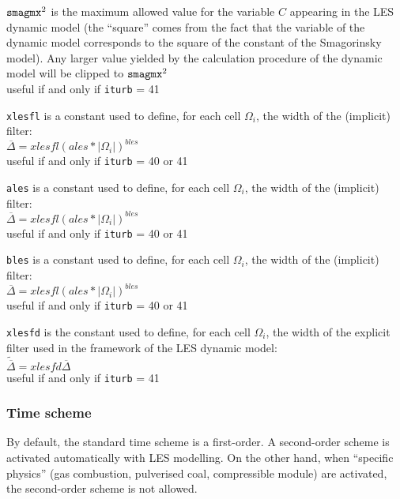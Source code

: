 {${\tt smagmx}^2$ is
the maximum allowed value for the variable $C$ appearing in the LES dynamic
model (the ``square'' comes from the fact that the
variable of the dynamic model corresponds to the square of the
constant of the Smagorinsky model). Any larger value yielded by the calculation
procedure of the dynamic model will be clipped to ${\tt smagmx}^2$\\
useful if and only if {\tt iturb} = 41}

{{\tt xlesfl} is a constant used to define, for
each cell $\Omega_i$, the width of the (implicit) filter:\\
$\overline{\Delta}=xlesfl(ales*|\Omega_i|)^{bles}$\\
useful if and only if {\tt iturb} = 40 or 41}

{{\tt ales} is a constant used to define, for
each cell $\Omega_i$, the width of the (implicit) filter:\\
$\overline{\Delta}=xlesfl(ales*|\Omega_i|)^{bles}$\\
useful if and only if {\tt iturb} = 40 or 41}

{{\tt bles} is a constant used to define, for
each cell $\Omega_i$, the width of the (implicit) filter:\\
$\overline{\Delta}=xlesfl(ales*|\Omega_i|)^{bles}$\\
useful if and only if {\tt iturb} = 40 or 41}

{{\tt xlesfd} is the constant used to define, for
each cell $\Omega_i$, the width of the explicit filter used in the framework of
the LES dynamic model:\\
$\widetilde{\overline{\Delta}}=xlesfd\overline{\Delta}$\\
useful if and only if {\tt iturb} = 41}



\subsubsection{Time scheme}

By default, the standard time scheme is a first-order.
A second-order scheme is activated automatically with LES modelling.
On the other hand, when ``specific physics'' (gas combustion, pulverised coal,
compressible module) are activated, the second-order scheme is not allowed.

